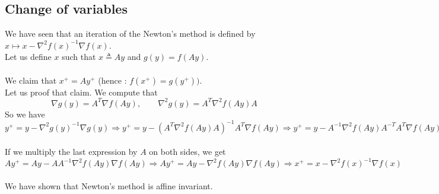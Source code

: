 \subsection{Change of variables}
We have seen that an iteration of the Newton's method is defined by $x \longmapsto x - \nabla^2f(x)^{-1}\nabla f(x)$. \\
Let us define $x$ such that $x \triangleq Ay$ and $g(y) = f(Ay)$. \\ \\
We claim that $x^+ = Ay^+$ (hence : $f(x^+) = g(y^+))$. \\
Let us proof that claim. We compute that
$$ \nabla g(y) = A^T \nabla f(Ay), \qquad \nabla^2 g(y) = A^T \nabla^2 f(Ay) A$$
So we have \\
$y^+ = y - \nabla^2 g(y)^{-1}\nabla g(y) \Longrightarrow y^+ = y - (A^T \nabla^2 f(Ay) A)^{-1} A^T \nabla f(Ay) \Longrightarrow y^+ = y - A^{-1} \nabla^2 f(Ay) A^{-T} A^T \nabla f(Ay)$ \\ \\
If we multiply the last expression by $A$ on both sides, we get \\
$ Ay^+ = Ay - AA^{-1} \nabla^2 f(Ay) \nabla f(Ay) \Longrightarrow Ay^+ = Ay - \nabla^2 f(Ay) \nabla f(Ay) \Longrightarrow x^+ = x - \nabla^2 f(x)^{-1} \nabla f(x)$ \\ \\
We have shown that Newton's method is affine invariant.


% 